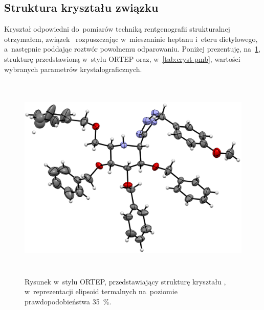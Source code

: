 \FloatBarrier
\pagebreak
\subsection{Struktura kryształu związku }
Kryształ odpowiedni do~pomiarów techniką rentgenografii strukturalnej otrzymałem,
  związek~ rozpuszczając w~mieszaninie heptanu i~eteru dietylowego,
  a~następnie poddając roztwór powolnemu odparowaniu.
Poniżej prezentuję, na~\cref{fig:cryst-pmb}, strukturę przedstawioną w~stylu ORTEP
  oraz, w~\cref{tab:cryst-pmb}, wartości wybranych parametrów krystalograficznych.

\begin{figure}[h]
    \includegraphics[height=100mm]{sugars/xray-glu-tet-pmb-full.eps}
    \caption{
      Rysunek w~stylu ORTEP, przedstawiający strukturę kryształu ,
        w~reprezentacji elipsoid termalnych na~poziomie prawdopodobieństwa \SI{35}{\percent}.
      }
    \label{fig:cryst-pmb}
\end{figure}

